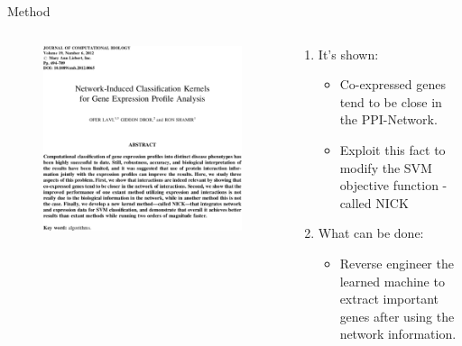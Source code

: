\documentclass[final]{beamer} %
\begin{document}
\begin{frame}{}
  \begin{block}{Method}
    \begin{columns}
      \begin{column}{0.3\textwidth}
        \begin{columns}
          \begin{column}{0.5\textwidth}
            \begin{figure}
              \includegraphics[width=1\textwidth]{NICK-paper}
            \end{figure}
          \end{column}
          \begin{column}{0.5\textwidth}
            \begin{enumerate}
            \item It's shown:
              \begin{itemize}
              \item Co-expressed genes tend to be close in the PPI-Network.
              \item Exploit this fact to modify the SVM objective function - called NICK
              \end{itemize}
            \item What can be done:
              \begin{itemize}
              \item Reverse engineer the learned machine to extract important genes after using the network information.
              \end{itemize}
            \end{enumerate}
          \end{column}
        \end{columns}
      \end{column}



\end{columns}
\end{block}
\end{frame}
\end{document}
